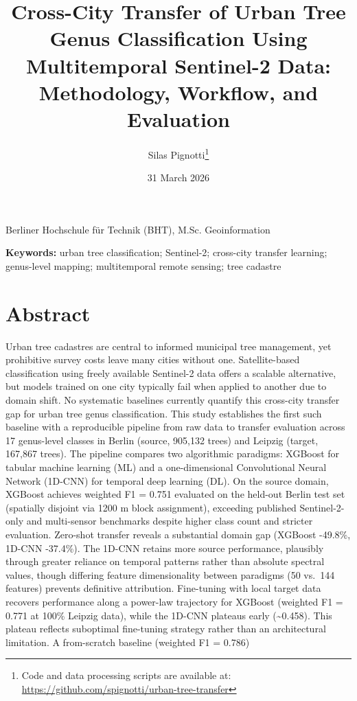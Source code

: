 \documentclass[11pt,a4paper]{scrartcl}
\title{Cross-City Transfer of Urban Tree Genus Classification Using
Multitemporal Sentinel-2 Data: Methodology, Workflow, and Evaluation}
\author{Silas
Pignotti\thanks{Code and data processing scripts are available at: \url{https://github.com/spignotti/urban-tree-transfer}}}
\date{31 March 2026}
\begin{document}
\maketitle

\begin{center}
\normalsize Berliner Hochschule für Technik (BHT), M.Sc. Geoinformation
\end{center}

\vspace{0.5em}
\noindent\textbf{Keywords:} urban tree
classification; Sentinel-2; cross-city transfer learning; genus-level
mapping; multitemporal remote sensing; tree cadastre

\section*{Abstract}
Urban tree cadastres are central to informed municipal tree management,
yet prohibitive survey costs leave many cities without one.
Satellite-based classification using freely available Sentinel-2 data
offers a scalable alternative, but models trained on one city typically
fail when applied to another due to domain shift. No systematic
baselines currently quantify this cross-city transfer gap for urban tree
genus classification. This study establishes the first such baseline
with a reproducible pipeline from raw data to transfer evaluation across
17 genus-level classes in Berlin (source, 905,132 trees) and Leipzig
(target, 167,867 trees). The pipeline compares two algorithmic
paradigms: XGBoost for tabular machine learning (ML) and a
one-dimensional Convolutional Neural Network (1D-CNN) for temporal deep
learning (DL). On the source domain, XGBoost achieves weighted F1 =
0.751 evaluated on the held-out Berlin test set (spatially disjoint via
1200 m block assignment), exceeding published Sentinel-2-only and
multi-sensor benchmarks despite higher class count and stricter
evaluation. Zero-shot transfer reveals a substantial domain gap (XGBoost
-49.8\%, 1D-CNN -37.4\%). The 1D-CNN retains more source performance,
plausibly through greater reliance on temporal patterns rather than
absolute spectral values, though differing feature dimensionality
between paradigms (50 vs.~144 features) prevents definitive attribution.
Fine-tuning with local target data recovers performance along a
power-law trajectory for XGBoost (weighted F1 = 0.771 at 100\% Leipzig
data), while the 1D-CNN plateaus early (\textasciitilde0.458). This
plateau reflects suboptimal fine-tuning strategy rather than an
architectural limitation. A from-scratch baseline (weighted F1 = 0.786)
\end{document}
